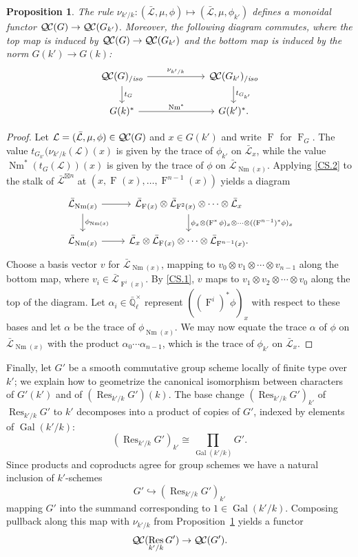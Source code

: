 \documentclass[11pt]{amsart}
\theoremstyle{plain}
\newtheorem{proposition}[theorem]{Proposition}
\theoremstyle{definition}
\theoremstyle{remark}
\newcommand{\EE}{\mathbb{\bar Q}_\ell}
\newcommand{\EEx}{\EE^\times}
\DeclareMathOperator{\Gal}{Gal}
\newcommand{\Frob}[1]{\operatorname{F}_{#1}}
\DeclareMathOperator{\Res}{Res}
\DeclareMathOperator{\Nm}{Nm}
\newcommand{\qcs}[1]{{\mathcal{#1}}}
\newcommand{\gqcs}[1]{{\mathcal{\bar #1}}}
\newcommand{\QC}{{\mathcal{Q\hskip-0.8pt C}}}
\newcommand{\QCiso}[1]{\QC(#1)_{/\textit{iso}}}
\newcommand{\trFrob}[1]{t_{#1}}
\begin{document}
\begin{proposition}\label{prop:basechange}
 The rule $\nu_{k'/k}: (\gqcs{L}, \mu, \phi) \mapsto (\gqcs{L}, \mu, \phi_{k'})$ 
 defines a monoidal functor $\QC(G) \to \QC(G_{k'})$. 
 Moreover, the following diagram commutes, 
 where the top map is induced by $\QC(G) \to \QC(G_{k'})$ 
 and the bottom map is induced by the norm $G(k') \rightarrow G(k)$:
\[
\begin{tikzcd}[column sep=60]
\QCiso{G} \rar{\nu_{k'/k}} \dar{\trFrob{G}} & \QCiso{G_{k'}} \dar{\trFrob{G_{k'}}} \\
G(k)^*  \rar{\Nm^*} & G(k')^*.
\end{tikzcd}
\]
\end{proposition}
\begin{proof}
Let $\qcs{L} = (\gqcs{L}, \mu, \phi) \in \QC(G)$ and $x \in G(k')$ and write $\Frob{}$ for $\Frob{G}$.
The value $t_{G_{k'}}(\nu_{k'/k}(\qcs{L})(x)$ is given by the trace of $\phi_{k'}$ on $\gqcs{L}_x$,
while the value $\Nm^*(t_G(\qcs{L}))(x)$ is given by the trace of $\phi$ on $\gqcs{L}_{\Nm(x)}$.
Applying \ref{CS.2} to the stalk of $\gqcs{L}^{\boxtimes n}$ at $(x, \Frob{}(x), \ldots, \Frob{}^{n-1}(x))$ yields a diagram
\[
\begin{tikzcd}
\gqcs{L}_{\Nm(x)} \rar \dar{\phi_{\Nm(x)}} & \gqcs{L}_{\Frob{}(x)} \otimes \gqcs{L}_{\Frob{}^2(x)} \otimes \cdots \otimes \gqcs{L}_x
\dar{\phi_x \otimes (\Frob{}^*\phi)_x \otimes \cdots \otimes ((\Frob{}^{n-1})^*\phi)_x} \\
\gqcs{L}_{\Nm(x)} \rar & \gqcs{L}_x \otimes \gqcs{L}_{\Frob{}(x)} \otimes \cdots \otimes \gqcs{L}_{\Frob{}^{n-1}(x)}.
\end{tikzcd}
\]
Choose a basis vector $v$ for $\gqcs{L}_{\Nm(x)}$, mapping to $v_0 \otimes v_1 \otimes \cdots \otimes v_{n-1}$
along the bottom map, where $v_i \in \gqcs{L}_{\Frob{}^i(x)}$.  By \ref{CS.1}, $v$ maps to
$v_1 \otimes v_2 \otimes \cdots \otimes v_0$ along the top of the diagram.
Let $\alpha_i \in \EEx$ represent $((\Frob{}^i)^*\phi)_x$ with respect to these bases and let $\alpha$ be
the trace of $\phi_{\Nm(x)}$.  We may now equate the trace $\alpha$ of $\phi$ on $\gqcs{L}_{\Nm(x)}$
with the product $\alpha_0 \cdots \alpha_{n-1}$, which is the trace of $\phi_{k'}$ on $\gqcs{L}_x$.
\end{proof}

Finally, let $G'$ be a smooth commutative group scheme locally of finite type over $k'$;
we explain how to geometrize the canonical isomorphism between characters of $G'(k')$ and of $(\Res_{k'/k}G')(k)$.
The base change $(\Res_{k'/k}G')_{k'}$ of $\Res_{k'/k}G'$ to $k'$
decomposes into a product of copies of $G'$, indexed by elements of $\Gal(k'/k)$:
\[
(\Res_{k'/k}G')_{k'} \cong \prod_{\Gal(k'/k)} G'.
\]
Since products and coproducts agree for group schemes we have a natural inclusion of $k'$-schemes 
\[
G' \hookrightarrow (\Res_{k'/k}G')_{k'}
\]
mapping $G'$ into the summand corresponding to $1 \in \Gal(k'/k)$.  Composing pullback
along this map with $\nu_{k'/k}$ from Proposition~\ref{prop:basechange} yields a functor
\[
\QC(\Res_{k'/k}G') \to \QC(G').
\]
\end{document}
